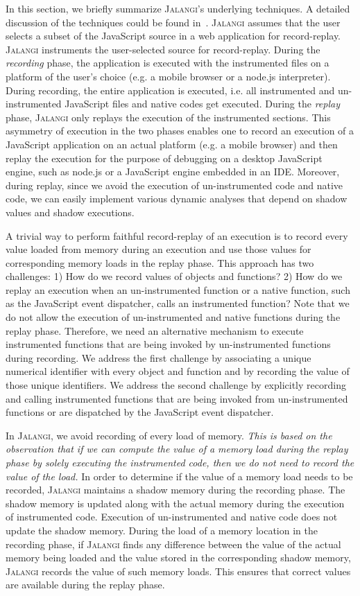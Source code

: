 \documentclass{sig-alternate}
\def\jalangi{\textsc{Jalangi}}
\begin{document}
In this section, we briefly summarize \jalangi{}'s underlying
techniques.  A detailed discussion of the techniques could be found
in~\cite{SBGKfse13}.  \jalangi{} assumes that the user selects a
subset of the JavaScript source in a web application for
record-replay.  \jalangi{} instruments the user-selected source for
record-replay.  During the \emph{recording} phase, the application is
executed with the instrumented files on a platform of the user's
choice (e.g. a mobile browser or a node.js interpreter).  During
recording, the entire application is executed, i.e. all instrumented
and un-instrumented JavaScript files and native codes get executed.
During the \emph{replay} phase, \jalangi{} only replays the execution
of the instrumented sections.  This asymmetry of execution in the two
phases enables one to record an execution of a JavaScript application
on an actual platform (e.g. a mobile browser) and then replay the
execution for the purpose of debugging on a desktop JavaScript engine,
such as node.js or a JavaScript engine embedded in an IDE.  Moreover,
during replay, since we avoid the execution of un-instrumented code
and native code, we can easily implement various dynamic analyses that
depend on shadow values and shadow executions.

A trivial way to perform faithful record-replay of an execution is to
record every value loaded from memory during an execution and use
those values for corresponding memory loads in the replay phase.  This
approach has two challenges: 1) How do we record values of objects and
functions?  2) How do we replay an execution when an un-instrumented
function or a native function, such as the JavaScript event
dispatcher, calls an instrumented function?  Note that we do not allow
the execution of un-instrumented and native functions during the
replay phase.  Therefore, we need an alternative mechanism to execute
instrumented functions that are being invoked by un-instrumented
functions during recording.  We address the first challenge by
associating a unique numerical identifier with every object and
function and by recording the value of those unique identifiers.  We
address the second challenge by explicitly recording and calling
instrumented functions that are being invoked from un-instrumented
functions or are dispatched by the JavaScript event dispatcher.


In \jalangi{}, we avoid recording of every load of memory.  \emph{This
  is based on the observation that if we can compute the value of a
  memory load during the replay phase by solely executing the
  instrumented code, then we do not need to record the value of the
  load.}  In order to determine if the value of a memory load needs to
be recorded, \jalangi{} maintains a shadow memory during the recording
phase.  The shadow memory is updated along with the actual memory
during the execution of instrumented code.  Execution of
un-instrumented and native code does not update the shadow memory.
During the load of a memory location in the recording phase, if
\jalangi{} finds any difference between the value of the actual memory
being loaded and the value stored in the corresponding shadow memory,
\jalangi{} records the value of such memory loads. This ensures that
correct values are available during the replay phase.
\end{document}
